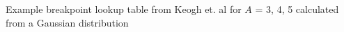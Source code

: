 Example breakpoint lookup table from Keogh et. al \cite{keogh_hot_2005} for $A$ = 3, 4, 5 calculated from a Gaussian distribution \cite{miller_automated_2015}
\label{fig:SAXBreakpoints}